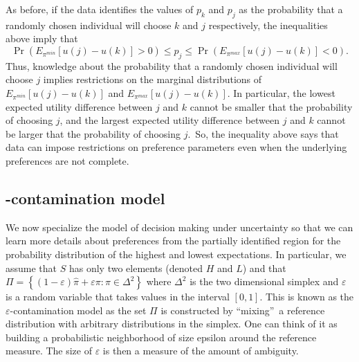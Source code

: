 \documentclass{article}
\begin{document}
As before, if the data identifies the values of $p_{k}$ and $p_{j}$ as the
probability that a randomly chosen individual will choose $k$ and $j$
respectively, the inequalities above imply that 
\begin{equation*}
\Pr \left( E_{\pi ^{min}}\left[ u\left( j\right) -u\left( k\right) \right]
>0\right) \leq p_{j}\leq \Pr \left( E_{\pi ^{max}}\left[ u\left( j\right)
-u\left( k\right) \right] <0\right) .
\end{equation*}%
Thus, knowledge about the probability that a randomly chosen individual will
choose $j$ implies restrictions on the marginal distributions of $E_{\pi
^{min}}\left[ u\left( j\right) -u\left( k\right) \right] $ and $E_{\pi
^{max}}\left[ u\left( j\right) -u\left( k\right) \right] $. In particular,
the lowest expected utility difference between $j$ and $k$ cannot be smaller
that the probability of choosing $j$, and the largest expected utility
difference between $j$ and $k$ cannot be larger that the probability of
choosing $j$.\ So, the inequality above says that data can impose
restrictions on preference parameters even when the underlying preferences
are not complete.

\subsection{ \boldmath{$\epsilon$} -contamination model}

We now specialize the model of decision making under uncertainty so that we
can learn more details about preferences from the partially identified
region for the probability distribution of the highest and lowest
expectations. In particular, we assume that $S$ has only two elements
(denoted $H$ and $L$) and that $\Pi =\left\{ (1-\varepsilon )\hat{\pi}%
+\varepsilon \pi :\pi \in \Delta ^{2}\right\} $ where $\Delta ^{2}$ is the
two dimensional simplex and $\varepsilon $ is a random variable that takes
values in the interval $\left[ 0,1\right] $. This is known as the $%
\varepsilon $-contamination model as the set $\Pi $ is constructed by
\textquotedblleft mixing\textquotedblright\ a reference distribution with
arbitrary distributions in the simplex. One can think of it as building a
probabilistic neighborhood of size epsilon around the reference measure. The
size of $\varepsilon $ is then a measure of the amount of ambiguity.
\end{document}
